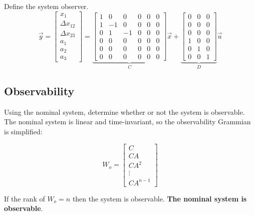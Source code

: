 \documentclass[12pt,onecolumn,reqno]{amsart}
\begin{document}
Define the system observer.
\begin{equation}
  \vec{y} = 
  \begin{bmatrix}
    x_{1}             \\
    \Delta x_{12}     \\
    \Delta x_{23}     \\
    a_{1}             \\
    a_{2}             \\
    a_{3}             
  \end{bmatrix}
  =
  \underbrace{
  \begin{bmatrix}
    1 & 0 & 0 & 0 & 0 & 0   \\
    1 & -1 & 0 & 0 & 0 & 0  \\
    0 & 1 & -1 & 0 & 0 & 0  \\
    0 & 0 & 0 & 0 & 0 & 0   \\
    0 & 0 & 0 & 0 & 0 & 0   \\
    0 & 0 & 0 & 0 & 0 & 0  
  \end{bmatrix}
  }_{C}
  \vec{x}
  +
  \underbrace{
  \begin{bmatrix}
    0 & 0 & 0 \\
    0 & 0 & 0 \\
    0 & 0 & 0 \\
    1 & 0 & 0 \\
    0 & 1 & 0 \\
    0 & 0 & 1
  \end{bmatrix}
  }_{D}
  \vec{u}
\end{equation}

\subsection{Observability}
Using the nominal system, determine whether or not the system is observable. The
nominal system is linear and time-invariant, so the observability Grammian is
simplified:

\begin{equation}
  W_{o} = 
  \begin{bmatrix}
    C      \\
    CA     \\
    CA^2   \\
    \vdots \\
    CA^{n-1}
  \end{bmatrix}
\end{equation}

If the rank of $W_{o} = n$ then the system is observable. \textbf{The nominal
system is observable}.
\end{document}
